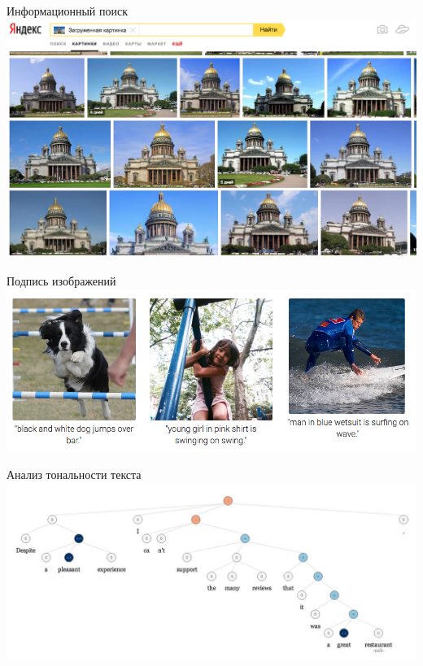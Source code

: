 \documentclass[10pt]{beamer}
\begin{document}
{
\begin{frame}{Информационный поиск}
  \centering
  \includegraphics[width=0.9 \linewidth, height=0.9 \textheight, keepaspectratio]{images/similar_image}\\
\end{frame}
}

{
\begin{frame}{Подпись изображений}
  \centering
  \includegraphics[width=0.9 \linewidth, height=0.9 \textheight, keepaspectratio]{images/image_captioning}\\
\end{frame}
}

{
\begin{frame}{Анализ тональности текста}
  \centering
  \includegraphics[width=\linewidth, height=\textheight, keepaspectratio]{images/sentiment}\\
\end{frame}
}
\end{document}
